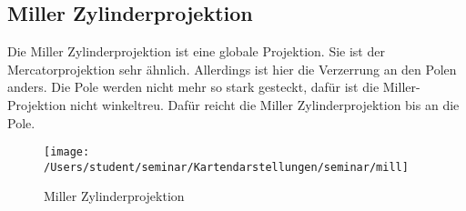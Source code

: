 \subsection{Miller Zylinderprojektion}
\label{sec:miller}
Die Miller Zylinderprojektion ist eine globale Projektion. Sie ist der Mercatorprojektion sehr ähnlich.
Allerdings ist hier die Verzerrung an den Polen anders. Die Pole werden nicht mehr so stark gesteckt, dafür ist die Miller-Projektion nicht winkeltreu. Dafür reicht die Miller Zylinderprojektion bis an die Pole. \\

\begin{figure}[hbtp]
\centering
\texttt{[image: /Users/student/seminar/Kartendarstellungen/seminar/mill]} \caption{Miller Zylinderprojektion}
\end{figure}
\newpage 
